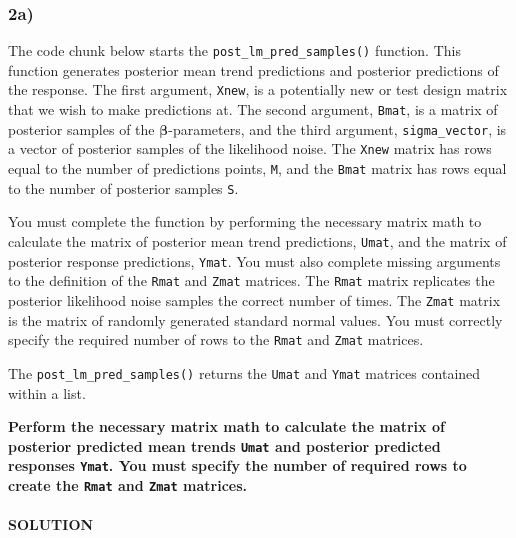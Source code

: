\documentclass[
]{article}
\begin{document}
\hypertarget{a-1}{%
\subsubsection{2a)}\label{a-1}}

The code chunk below starts the \texttt{post\_lm\_pred\_samples()}
function. This function generates posterior mean trend predictions and
posterior predictions of the response. The first argument,
\texttt{Xnew}, is a potentially new or test design matrix that we wish
to make predictions at. The second argument, \texttt{Bmat}, is a matrix
of posterior samples of the \(\boldsymbol{\beta}\)-parameters, and the
third argument, \texttt{sigma\_vector}, is a vector of posterior samples
of the likelihood noise. The \texttt{Xnew} matrix has rows equal to the
number of predictions points, \texttt{M}, and the \texttt{Bmat} matrix
has rows equal to the number of posterior samples \texttt{S}.

You must complete the function by performing the necessary matrix math
to calculate the matrix of posterior mean trend predictions,
\texttt{Umat}, and the matrix of posterior response predictions,
\texttt{Ymat}. You must also complete missing arguments to the
definition of the \texttt{Rmat} and \texttt{Zmat} matrices. The
\texttt{Rmat} matrix replicates the posterior likelihood noise samples
the correct number of times. The \texttt{Zmat} matrix is the matrix of
randomly generated standard normal values. You must correctly specify
the required number of rows to the \texttt{Rmat} and \texttt{Zmat}
matrices.

The \texttt{post\_lm\_pred\_samples()} returns the \texttt{Umat} and
\texttt{Ymat} matrices contained within a list.

\textbf{Perform the necessary matrix math to calculate the matrix of
posterior predicted mean trends \texttt{Umat} and posterior predicted
responses \texttt{Ymat}. You must specify the number of required rows to
create the \texttt{Rmat} and \texttt{Zmat} matrices.}

\hypertarget{solution-5}{%
\paragraph{SOLUTION}\label{solution-5}}
\end{document}
